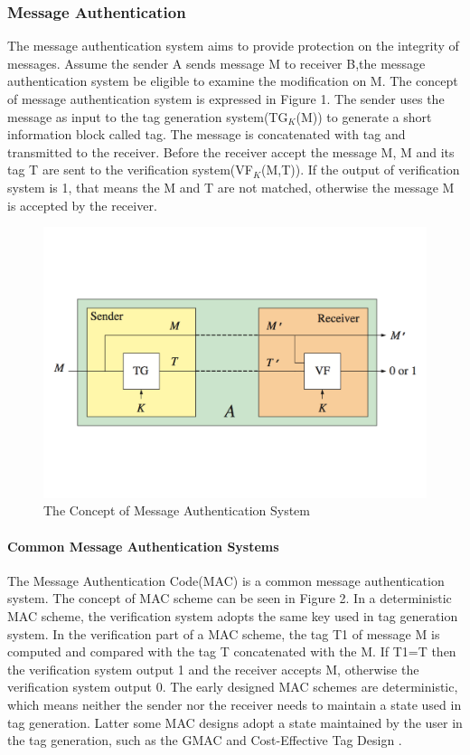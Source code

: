 \documentclass{article}
\begin{document}
\subsubsection{Message Authentication}
The message authentication system aims to provide protection on the integrity of messages. Assume the sender A sends message M to receiver B,the message authentication system be eligible to examine the modification on M. The concept of message authentication system is expressed in Figure 1. The sender uses the message as input to the tag generation system(TG$_K$(M)) to generate a short information block called tag. The message is concatenated with tag and transmitted to the receiver. Before the receiver accept the message M, M and its tag T are sent to the verification system(VF$_K$(M,T)). If the output of verification system is 1, that means the M and T are not matched, otherwise the message M is accepted by the receiver. 
\begin{figure}[htbp]
\centering
\includegraphics[scale=0.4]{./diagram/ma.pdf}
\caption{The Concept of Message Authentication System}
\label{fig:1 }
\end{figure}
\paragraph{Common Message Authentication Systems}
The Message Authentication Code(MAC) is a common message authentication system. The concept of MAC scheme can be seen in Figure 2. In a deterministic MAC scheme, the verification system adopts the same key used in tag generation system. In the verification part of a MAC scheme, the tag T1 of message M is computed and compared with the tag T concatenated with the M. If T1=T then the verification system output 1 and the receiver accepts M, otherwise the verification system output 0. 
The early designed MAC schemes are deterministic, which means neither the sender nor the receiver needs to maintain a state used in tag generation. Latter some MAC designs adopt a state maintained by the user in the tag generation, such as the GMAC \cite{gcm} and Cost-Effective Tag Design \cite{cetd}.  
\end{document}
